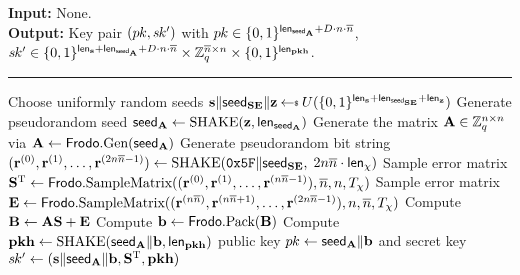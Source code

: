 \begin{algorithm}[t]
\caption{\label{alg:KEM:KeyGen} $\FrodoKEM.\KeyGen$.}
{\bf Input:} None.\\
{\bf Output:} Key pair $(\pk, \sk')$ with $\pk \in \{0,1\}^{\lengthseedA + D\cdot n \cdot \nbar}$, $\sk' \in \{0,1\}^{\lengths + \lengthseedA + D\cdot n \cdot \nbar}\times \bbZ_q^{\nbar\times n} \times \{0,1\}^{\lengthpkhash}$.\\[-1.5ex]
\rule{\linewidth}{.5pt}
\vspace{-0.5cm}
\begin{algorithmic}[1]
    \STATE Choose uniformly random seeds $\bfs \| \seedSE\| \bfz \getsr U(\{0,1\}^{\lengths + \lengthseedSE + \lengthz})$
    \STATE Generate pseudorandom seed $\seedA \gets \SHAKE(\bfz, \lengthseedA)$
    \STATE Generate the matrix $\bfA \in \bbZ_q^{n \times n}$ via $\bfA\gets\Frodo.\gen(\seedA)$
    \STATE Generate pseudorandom bit string $ (\bfr^{(0)}, \bfr^{(1)}, \dots, \bfr^{(2n\nbar-1)}) \gets \SHAKE(\mathtt{0x5F} \| \seedSE,$ $2n\nbar \cdot \lengthchi)$
    \STATE Sample error matrix $\bfS^\text{T} \gets \Frodo.\SampV((\bfr^{(0)}, \bfr^{(1)}, \dots, \bfr^{(n\nbar-1)}), \nbar, n, T_\chi)$
    \STATE Sample error matrix $\bfE \gets \Frodo.\SampV((\bfr^{(n\nbar)}, \bfr^{(n\nbar+1)}, \dots, \bfr^{(2n\nbar-1)}), n, \nbar, T_\chi)$
    \STATE Compute $\bfB \gets \bfA\bfS + \bfE$
    \STATE Compute $\bfb \gets \Frodo.\Pack(\bfB)$
    \STATE Compute $\pkh \gets \SHAKE(\seedA\| \bfb, \lengthpkhash)$
    \RETURN public key $\pk \gets \seedA\| \bfb$ and secret key $\sk' \gets (\bfs \| \seedA \| \bfb, \bfS^\text{T}, \pkh)$
\end{algorithmic}
\end{algorithm}

